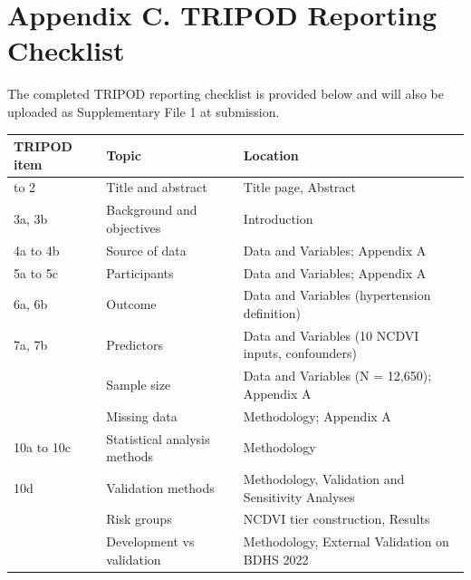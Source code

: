\documentclass[
  12pt,
  a4paper]{article}
\newcounter{none} %
\begin{document}
\section*{Appendix C. TRIPOD Reporting Checklist}\label{appendix-c.-tripod-reporting-checklist}

The completed TRIPOD reporting checklist \citep{moons_tripod_2015} is provided below and will also be uploaded as Supplementary File 1 at submission.

{\def\LTcaptype{none} %
\begin{longtable}[]{@{}
  >{\raggedright\arraybackslash}p{}
  >{\raggedright\arraybackslash}p{}
  >{\raggedright\arraybackslash}p{}@{}}
\toprule\noalign{}
\begin{minipage}[b]{\linewidth}\raggedright
TRIPOD item
\end{minipage} & \begin{minipage}[b]{\linewidth}\raggedright
Topic
\end{minipage} & \begin{minipage}[b]{\linewidth}\raggedright
Location
\end{minipage} \\
\midrule\noalign{}
\endhead
\bottomrule\noalign{}
\endlastfoot
1 to 2 & Title and abstract & Title page, Abstract \\
3a, 3b & Background and objectives & Introduction \\
4a to 4b & Source of data & Data and Variables; Appendix A \\
5a to 5c & Participants & Data and Variables; Appendix A \\
6a, 6b & Outcome & Data and Variables (hypertension definition) \\
7a, 7b & Predictors & Data and Variables (10 NCDVI inputs, confounders) \\
8 & Sample size & Data and Variables (N = 12,650); Appendix A \\
9 & Missing data & Methodology; Appendix A \\
10a to 10c & Statistical analysis methods & Methodology \\
10d & Validation methods & Methodology, Validation and Sensitivity Analyses \\
11 & Risk groups & NCDVI tier construction, Results \\
12 & Development vs validation & Methodology, External Validation on BDHS 2022 \\

\end{longtable}}
\end{document}
